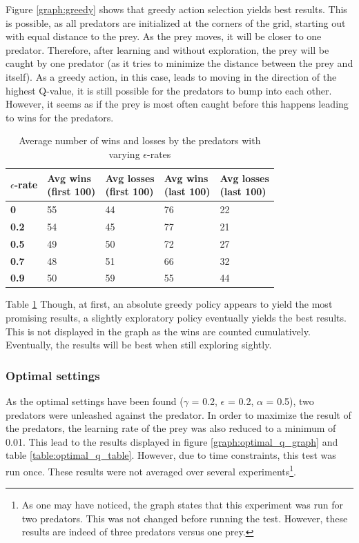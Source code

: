 Figure \ref{graph:greedy} shows that greedy action selection yields best results. This is possible, as all predators are initialized at the corners of the grid, starting out with equal distance to the prey. As the prey moves, it will be closer to one predator. Therefore, after learning and without exploration, the prey will be caught by one predator (as it tries to minimize the distance between the prey and itself). As a greedy action, in this case, leads to moving in the direction of the highest Q-value, it is still possible for the predators to bump into each other. However, it seems as if the prey is most often caught before this happens leading to wins for the predators.

\begin{table}[H]
\begin{center}
\begin{tabular}{| l | l | l | l | l |}
\hline
\parbox{2cm}{\textbf{$\epsilon$-rate}} & \parbox{2cm}{\textbf{Avg wins \\ (first 100)}} & \parbox{2cm}{\textbf{Avg losses \\ (first 100)}} & \parbox{2cm}{\textbf{Avg wins \\ (last 100)}} & \parbox{2cm}{\textbf{Avg losses \\ (last 100)}} \\
\hline
\textbf{0} & 55 & 44 & 76 & 22 \\
\hline
\textbf{0.2} & 54 & 45 & 77 & 21 \\
\hline
\textbf{0.5} & 49 & 50 & 72 & 27 \\
\hline
\textbf{0.7} & 48 & 51 & 66 & 32 \\
\hline
\textbf{0.9} & 50 & 59 & 55 & 44 \\
\hline
\end{tabular}
\caption{Average number of wins and losses by the predators with varying $\epsilon$-rates}
\label{table:greedy}
\end{center}
\end{table}

Table \ref{table:greedy} Though, at first, an absolute greedy policy appears to yield the most promising results, a slightly exploratory policy eventually yields the best results. This is not displayed in the graph as the wins are counted cumulatively. Eventually, the results will be best when still exploring sightly.

\subsubsection{Optimal settings}
As the optimal settings have been found ($\gamma$ = 0.2, $\epsilon$ = 0.2, $\alpha$ = 0.5), two predators were unleashed against the predator. In order to maximize the result of the predators, the learning rate of the prey was also reduced to a minimum of 0.01. This lead to the results displayed in figure \ref{graph:optimal_q_graph} and table \ref{table:optimal_q_table}. However, due to time constraints, this test was run once. These results were not averaged over several experiments\footnote{As one may have noticed, the graph states that this experiment was run for two predators. This was not changed before running the test. However, these results are indeed of three predators versus one prey.}.

